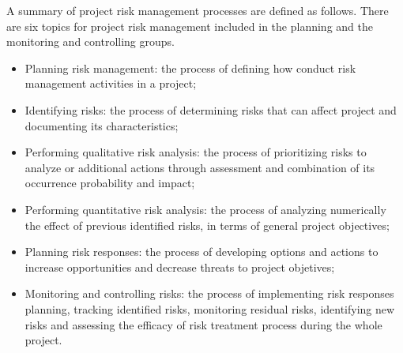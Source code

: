 A summary of project risk management processes are defined as follows. There are six topics for project risk management included in the planning and the monitoring and controlling groups.
\begin{itemize}
\item Planning risk management: the process of defining how conduct risk management activities in a project;
\item Identifying risks: the process of determining risks that can affect project and documenting its characteristics;
\item Performing qualitative risk analysis: the process of prioritizing risks to analyze or additional actions through assessment and combination of its occurrence probability and impact;
\item Performing quantitative risk analysis: the process of analyzing numerically the effect of previous identified risks, in terms of general project objectives;
\item Planning risk responses: the process of developing options and actions to increase opportunities and decrease threats to project objetives;
\item Monitoring and controlling risks: the process of implementing risk responses planning, tracking identified risks, monitoring residual risks, identifying new risks and assessing the efficacy of risk treatment process during the whole project.
\end{itemize}

